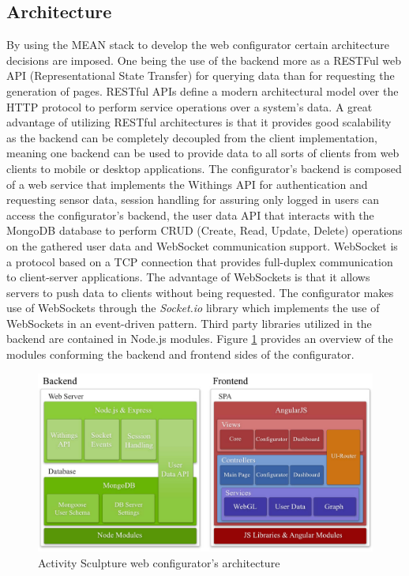 \documentclass[../medieninformatik-arbeit.tex]{subfiles}
\begin{document}
\subsection{Architecture}
By using the MEAN stack to develop the web configurator certain architecture decisions are imposed. One being the use of the backend more as a RESTFul web API (Representational State Transfer) for querying data than for requesting the generation of pages. RESTful APIs define a modern architectural model over the HTTP protocol to perform service operations over a system's data\cite{Fielding:2000:PDM:337180.337228}. A great advantage of utilizing RESTful architectures is that it provides good scalability as the backend can be completely decoupled from the client implementation, meaning one backend can be used to provide data to all sorts of clients from web clients to mobile or desktop applications. The configurator's backend is composed of a web service that implements the Withings API for authentication and requesting sensor data, session handling for assuring only logged in users can access the configurator's backend, the user data API that interacts with the MongoDB database to perform CRUD (Create, Read, Update, Delete) operations on the gathered user data and WebSocket communication support. WebSocket is a protocol based on a TCP connection that provides full-duplex communication to client-server applications\cite{fette2011websocket}. The advantage of WebSockets is that it allows servers to push data to clients without being requested. The configurator makes use of WebSockets through the \textit{Socket.io}\cite{socketio} library which implements the use of WebSockets in an event-driven pattern. Third party libraries utilized in the backend are contained in Node.js modules. Figure \ref{fig:architecture} provides an overview of the modules conforming the backend and frontend sides of the configurator.  

\begin{figure}[h]
\captionsetup{width=\textwidth}
\begin{center}
  \includegraphics[width=\textwidth]{Configurator/img/Architecture}
  \caption{Activity Sculpture web configurator's architecture}
\label{fig:architecture}
\end{center}
\end{figure}
\end{document}
